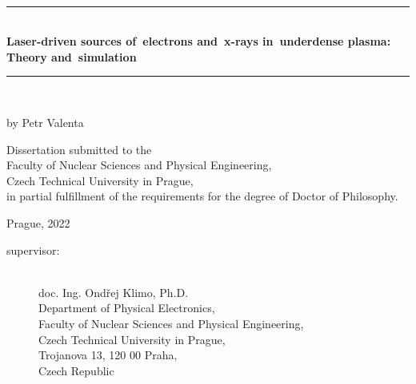 \documentclass[10pt, a4paper, twoside, openright]{report}
\newcommand{\ctu}{Czech Technical University in Prague}
\newcommand{\fnspe}{Faculty of Nuclear Sciences and Physical Engineering}
\newcommand{\dpe}{Department of Physical Electronics}
\newcommand{\projecttitle}{Laser-driven sources of~electrons and~x-rays in~underdense plasma: Theory and~simulation}
\newcommand{\klimo}{doc. Ing. Ondřej Klimo, Ph.D.}
\begin{document}
\pagestyle{empty}



\begin{titlepage}

\begin{center}
\epsfysize=35mm  \\[15mm]
\end{center}

\begin{center}
\begin{spacing}{2.0}
{\rule{125mm}{2pt}} \\[4mm]
{\huge \bf \projecttitle} \\
{\rule{125mm}{2pt}} \\[5mm]
\end{spacing}
{\LARGE by Petr Valenta} \\
\end{center}

\vfill

\begin{center}
\parbox{0.75\textwidth}{\noindent \centering \large Dissertation submitted to the \\ \fnspe, \\ \ctu, \\ in partial fulfillment of the requirements for the degree of Doctor of Philosophy.}
\end{center}

\vfill

\begin{center}
{\large Prague, 2022}
\end{center}

\end{titlepage}


\newpage
\rule{0pt}{0pt}
\vfill
\begin{description}
	\item[supervisor:]\ \\
	\klimo \\
	\dpe, \\
	\fnspe, \\ 
	\ctu, \\
	Trojanova 13, 120 00 Praha, \\
	Czech Republic
\end{description}
\end{document}
